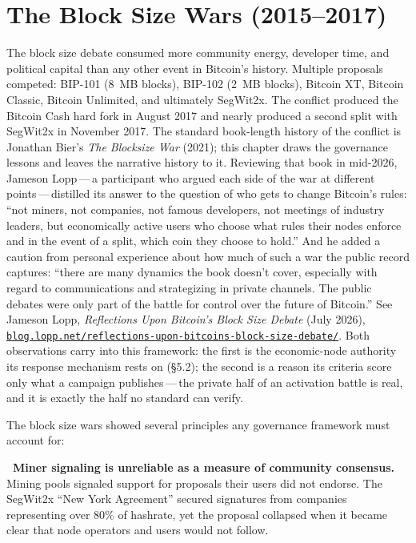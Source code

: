 \documentclass[11pt, twoside, openright]{book}
\newcommand{\reqitem}[2]{\medskip\noindent\textbf{#1\ #2}\quad\ignorespaces}
\newcommand{\sect}[1]{\S#1}
\begin{document}
\section{The Block Size Wars (2015--2017)}

The block size debate consumed more community energy, developer time, and political capital than any other event in Bitcoin's history. Multiple proposals competed: BIP-101 (8~MB blocks), BIP-102 (2~MB blocks), Bitcoin XT, Bitcoin Classic, Bitcoin Unlimited, and ultimately SegWit2x. The conflict produced the Bitcoin Cash hard fork in August 2017 and nearly produced a second split with SegWit2x in November 2017. The standard book-length history of the conflict is Jonathan Bier's \textit{The Blocksize War} (2021); this chapter draws the governance lessons and leaves the narrative history to it. Reviewing that book in mid-2026, Jameson Lopp\,---\,a participant who argued each side of the war at different points\,---\,distilled its answer to the question of who gets to change Bitcoin's rules: ``not miners, not companies, not famous developers, not meetings of industry leaders, but economically active users who choose what rules their nodes enforce and in the event of a split, which coin they choose to hold.'' And he added a caution from personal experience about how much of such a war the public record captures: ``there are many dynamics the book doesn't cover, especially with regard to communications and strategizing in private channels. The public debates were only part of the battle for control over the future of Bitcoin.'' See Jameson Lopp, \textit{Reflections Upon Bitcoin's Block Size Debate} (July 2026), \href{https://blog.lopp.net/reflections-upon-bitcoins-block-size-debate/}{\nolinkurl{blog.lopp.net/reflections-upon-bitcoins-block-size-debate/}}. Both observations carry into this framework: the first is the economic-node authority its response mechanism rests on (\sect{5.2}); the second is a reason its criteria score only what a campaign publishes\,---\,the private half of an activation battle is real, and it is exactly the half no standard can verify.

The block size wars showed several principles any governance framework must account for:

\reqitem{}{Miner signaling is unreliable as a measure of community consensus.} Mining pools signaled support for proposals their users did not endorse. The SegWit2x ``New York Agreement'' secured signatures from companies representing over 80\% of hashrate, yet the proposal collapsed when it became clear that node operators and users would not follow.
\end{document}

